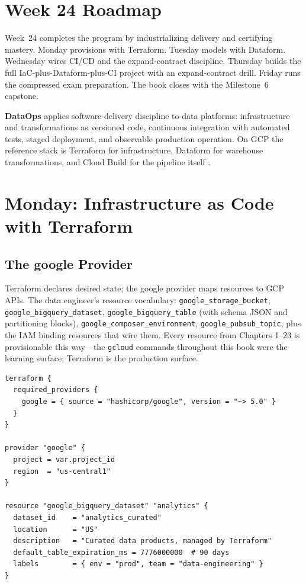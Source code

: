\section{Week 24 Roadmap}
Week~24 completes the program by industrializing delivery and certifying mastery. Monday provisions with Terraform. Tuesday models with Dataform. Wednesday wires CI/CD and the expand-contract discipline. Thursday builds the full IaC-plus-Dataform-plus-CI project with an expand-contract drill. Friday runs the compressed exam preparation. The book closes with the Milestone~6 capstone.

\begin{definitionbox}
\textbf{DataOps} applies software-delivery discipline to data platforms: infrastructure and transformations as versioned code, continuous integration with automated tests, staged deployment, and observable production operation. On GCP the reference stack is Terraform for infrastructure, Dataform for warehouse transformations, and Cloud Build for the pipeline itself \cite{terraformgoogleprovider,googleclouddataformdocs,googlecloudbuilddocs}.
\end{definitionbox}

\section{Monday: Infrastructure as Code with Terraform}

\subsection{The google Provider}
Terraform declares desired state; the google provider maps resources to GCP APIs. The data engineer's resource vocabulary: \texttt{google\_storage\_bucket}, \texttt{google\_bigquery\_dataset}, \texttt{google\_bigquery\_table} (with schema JSON and partitioning blocks), \texttt{google\_composer\_environment}, \texttt{google\_pubsub\_topic}, plus the IAM binding resources that wire them. Every resource from Chapters 1--23 is provisionable this way---the \texttt{gcloud} commands throughout this book were the learning surface; Terraform is the production surface.

\begin{lstlisting}[caption={Terraform provisioning a governed BigQuery dataset.}]
terraform {
  required_providers {
    google = { source = "hashicorp/google", version = "~> 5.0" }
  }
}

provider "google" {
  project = var.project_id
  region  = "us-central1"
}

resource "google_bigquery_dataset" "analytics" {
  dataset_id    = "analytics_curated"
  location      = "US"
  description   = "Curated data products, managed by Terraform"
  default_table_expiration_ms = 7776000000  # 90 days
  labels        = { env = "prod", team = "data-engineering" }
}
\end{lstlisting}

